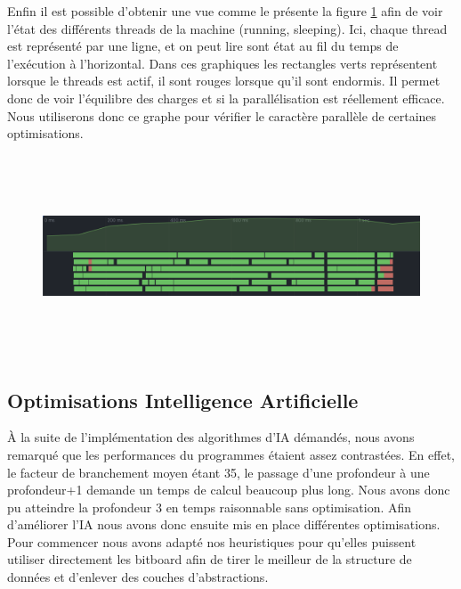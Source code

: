 \documentclass{article}
\begin{document}
Enfin il est possible d'obtenir une vue comme le présente la figure \ref{thread_ex} afin de voir l'état des différents threads de la machine (running, sleeping). Ici, chaque thread est représenté
par une ligne, et on peut lire sont état au fil du temps de l'exécution à l'horizontal. Dans ces graphiques les rectangles verts
représentent lorsque le threads est actif, il sont rouges lorsque qu'il sont endormis. Il permet donc de voir l'équilibre des charges et si la parallélisation est réellement efficace.
Nous utiliserons donc ce graphe pour vérifier le caractère parallèle de certaines optimisations.

\begin{figure}[h]
    \centering
    \includegraphics[width=\textwidth,height=6.0cm,keepaspectratio]{threads_ex.png}
    \caption{}
    \label{thread_ex}
\end{figure}
\FloatBarrier

\subsection{Optimisations Intelligence Artificielle}
À la suite de l'implémentation des algorithmes d'IA démandés, nous avons remarqué que les performances du programmes étaient assez contrastées. En effet, le facteur
de branchement moyen étant 35, le passage d'une profondeur à une profondeur+1 demande un temps de calcul beaucoup plus long. Nous avons donc pu atteindre la profondeur 3
en temps raisonnable sans optimisation. Afin d'améliorer l'IA nous avons donc ensuite mis en place différentes optimisations. Pour commencer nous avons adapté nos heuristiques
pour qu'elles puissent utiliser directement les bitboard afin de tirer le meilleur de la structure de données et d'enlever des couches d'abstractions.
\end{document}
